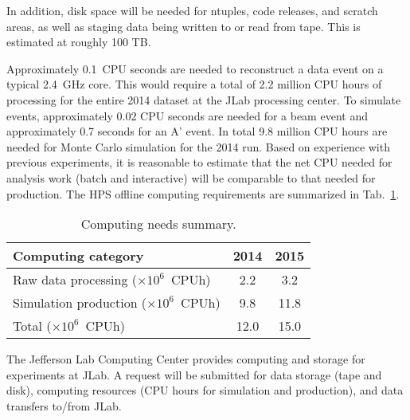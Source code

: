 In addition, disk space will be 
needed for ntuples, code releases, and scratch areas, as well as staging data being written to or read from tape. This is estimated at roughly 100 TB.

Approximately 0.1~CPU seconds are needed to reconstruct a data event on 
a typical 2.4~GHz core. This would require a total of 2.2 million CPU hours of processing for the 
entire 2014 dataset at the JLab processing center.  To simulate events, approximately 0.02 CPU seconds 
are needed for a beam event and approximately 0.7 seconds for an A' event. In total 9.8 million CPU hours are needed for Monte Carlo 
simulation for the 2014 run. 
Based on experience with previous experiments, it is reasonable to estimate that the net CPU needed for 
analysis work (batch and interactive) will be comparable to that needed for production. 
The HPS offline computing requirements 
are summarized in Tab.~\ref{tab:computing}.
\begin{table}[tbp]
\centering
\begin{tabular}{|l|c|c|}
\hline
Computing category & 2014& 2015 \\
\hline
Raw data processing ($\times 10^{6}$~CPUh)  & 2.2 & 3.2 \\
Simulation production ($\times 10^{6}$~CPUh) & 9.8 & 11.8 \\
\hline
Total ($\times 10^{6}$~CPUh) & 12.0 & 15.0 \\
\hline
\end{tabular}
\caption{{\small Computing needs summary.}}
\label{tab:computing}
\end{table}

The Jefferson Lab Computing Center provides computing and storage for experiments at JLab. 
A request will be submitted for data storage (tape and disk), computing resources (CPU hours for simulation and production), and data transfers to/from JLab.
